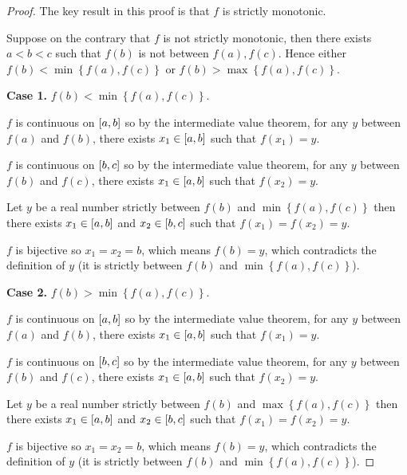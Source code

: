 \begin{proof}
	The key result in this proof is that \( f \) is strictly monotonic.

	Suppose on the contrary that \( f \) is not strictly monotonic, then there exists \( a < b < c \) such that \( f(b) \) is not between \( f(a), f(c) \). Hence either \( f(b) < \min\left\{ f(a), f(c) \right\} \) or \( f(b) > \max\left\{ f(a), f(c) \right\} \).

	\textbf{Case 1.} \( f(b) < \min\left\{ f(a), f(c) \right\} \).

	\( f \) is continuous on \( \left\lbrack{a, b}\right\rbrack \) so by the intermediate value theorem, for any \( y \) between \( f(a) \) and \( f(b) \), there exists \( x_{1} \in \left\lbrack{a, b}\right\rbrack \) such that \( f(x_{1}) = y \).

	\( f \) is continuous on \( \left\lbrack{b, c}\right\rbrack \) so by the intermediate value theorem, for any \( y \) between \( f(b) \) and \( f(c) \), there exists \( x_{1} \in \left\lbrack{a, b}\right\rbrack \) such that \( f(x_{2}) = y \).

	Let \( y \) be a real number strictly between \( f(b) \) and \( \min\left\{ f(a), f(c) \right\} \) then there exists \( x_{1} \in \left\lbrack{a, b}\right\rbrack \) and \( x_{2} \in \left\lbrack{b, c}\right\rbrack \) such that \( f(x_{1}) = f(x_{2}) = y \).

	\( f \) is bijective so \( x_{1} = x_{2} = b \), which means \( f(b) = y \), which contradicts the definition of \( y \) (it is strictly between \( f(b) \) and \( \min\left\{ f(a), f(c) \right\} \)).

	\textbf{Case 2.} \( f(b) > \min\left\{ f(a), f(c) \right\} \).

	\( f \) is continuous on \( \left\lbrack{a, b}\right\rbrack \) so by the intermediate value theorem, for any \( y \) between \( f(a) \) and \( f(b) \), there exists \( x_{1} \in \left\lbrack{a, b}\right\rbrack \) such that \( f(x_{1}) = y \).

	\( f \) is continuous on \( \left\lbrack{b, c}\right\rbrack \) so by the intermediate value theorem, for any \( y \) between \( f(b) \) and \( f(c) \), there exists \( x_{1} \in \left\lbrack{a, b}\right\rbrack \) such that \( f(x_{2}) = y \).

	Let \( y \) be a real number strictly between \( f(b) \) and \( \max\left\{ f(a), f(c) \right\} \) then there exists \( x_{1} \in \left\lbrack{a, b}\right\rbrack \) and \( x_{2} \in \left\lbrack{b, c}\right\rbrack \) such that \( f(x_{1}) = f(x_{2}) = y \).

	\( f \) is bijective so \( x_{1} = x_{2} = b \), which means \( f(b) = y \), which contradicts the definition of \( y \) (it is strictly between \( f(b) \) and \( \min\left\{ f(a), f(c) \right\} \)).


\end{proof}
